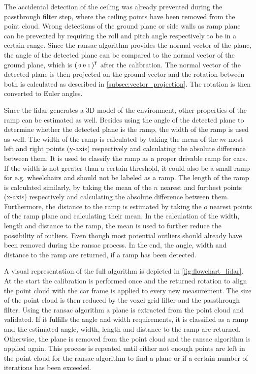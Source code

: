 The accidental detection of the ceiling was already prevented during the passthrough filter step, where the ceiling points have been removed from the point cloud.
Wrong detections of the ground plane or side walls as ramp plane can be prevented by requiring the roll and pitch angle respectively to be in a certain range.
Since the \gls{ransac} algorithm provides the normal vector of the plane, the angle of the detected plane can be compared to the normal vector of the ground plane, which is $\smqty(0 & 0 & 1)^\intercal$ after the calibration.
The normal vector of the detected plane is then projected on the ground vector and the rotation between both is calculated as described in \cref{subsec:vector_projection}.
The rotation is then converted to Euler angles.

Since the \gls{lidar} generates a 3D model of the environment, other properties of the ramp can be estimated as well.
Besides using the angle of the detected plane to determine whether the detected plane is the ramp, the width of the ramp is used as well.
The width of the ramp is calculated by taking the mean of the $m$ most left and right points (y-axis) respectively and calculating the absolute difference between them.
It is used to classify the ramp as a proper drivable ramp for cars.
If the width is not greater than a certain threshold, it could also be a small ramp for e.g. wheelchairs and should not be labeled as a ramp.
The length of the ramp is calculated similarly, by taking the mean of the $n$ nearest and furthest points (x-axis) respectively and calculating the absolute difference between them.
Furthermore, the distance to the ramp is estimated by taking the $o$ nearest points of the ramp plane and calculating their mean.
In the calculation of the width, length and distance to the ramp, the mean is used to further reduce the possibility of outliers.
Even though most potential outliers should already have been removed during the \gls{ransac} process.
In the end, the angle, width and distance to the ramp are returned, if a ramp has been detected.

A visual representation of the full algorithm is depicted in \cref{fig:flowchart_lidar}.
At the start the calibration is performed once and the returned rotation to align the point cloud with the car frame is applied to every new measurement.
The size of the point cloud is then reduced by the voxel grid filter and the passthrough filter.
Using the \gls{ransac} algorithm a plane is extracted from the point cloud and validated.
If it fulfills the angle and width requirements, it is classified as a ramp and the estimated angle, width, length and distance to the ramp are returned.
Otherwise, the plane is removed from the point cloud and the \gls{ransac} algorithm is applied again.
This process is repeated until either not enough points are left in the point cloud for the \gls{ransac} algorithm to find a plane or if a certain number of iterations has been exceeded.



